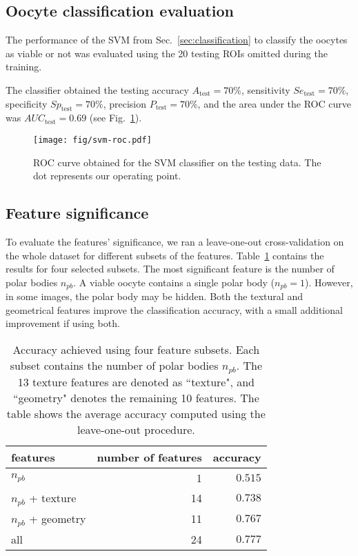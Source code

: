 \documentclass[]{spie}  %
\begin{document}
\subsection{Oocyte classification evaluation}
\label{sec:classification-results}

The performance of the SVM from Sec.~\ref{sec:classification} to
classify the oocytes as viable or not was evaluated
using the 20 testing ROIs omitted during the training.

The classifier obtained the testing accuracy $A_{\text{test}} = 70\%$, sensitivity $Se_{\text{test}}=70\%$, specificity $Sp_{\text{test}}=70\%$, precision $P_{\text{test}}=70\%$, and the area under the ROC curve was $AUC_{\text{test}}=0.69$ (see Fig.~\ref{fig:svm-roc}).

\begin{figure}[tb]
\centering
\texttt{[image: fig/svm-roc.pdf]}
\caption{ROC curve obtained for the SVM classifier on the testing
  data. The dot represents our operating point.}
\label{fig:svm-roc}
\end{figure}

\subsection{Feature significance}

To evaluate the features' significance, we ran a leave-one-out cross-validation on the whole dataset for different subsets of the features. Table~\ref{tab:feature-significance} contains the results for four selected subsets. The most significant feature is the number of polar bodies $n_{pb}$. A viable oocyte contains a single polar body ($n_{pb}=1$). However, in some images, the polar body may be hidden. Both the textural and geometrical features improve the classification accuracy, with a small additional improvement if using both.

\begin{table}[b]
\centering
\caption{Accuracy achieved using four feature subsets. Each subset contains the
number of polar bodies $n_{pb}$. The 13 texture features are denoted as
``texture", and ``geometry" denotes the remaining 10 features. The table shows
the average accuracy computed using the leave-one-out procedure.}
\label{tab:feature-significance}
\begin{tabular}{lrr}
\hline
features & number of features & accuracy \\
\hline
$n_{pb}$            & 1 & $0.515$ \\
$n_{pb}$ + texture  & 14 & $0.738$ \\
$n_{pb}$ + geometry & 11 & $0.767$ \\
all                 & 24 & $0.777$ \\
\hline
\end{tabular}
\end{table}
\end{document}
